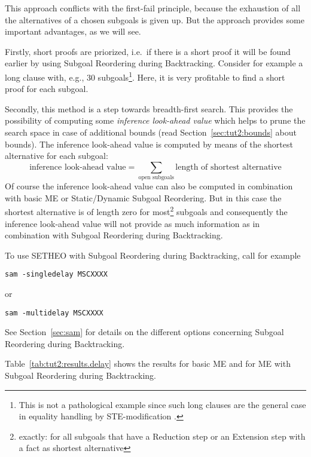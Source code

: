 This approach conflicts with the first-fail principle, because the
exhaustion of all the alternatives of a chosen subgoals is given
up. But the approach provides some important advantages, as we will
see. 

Firstly, short proofs are priorized, i.e.\ if there is a short proof
it will be found earlier by using Subgoal Reordering during
Backtracking. Consider for example a long clause with, e.g., 30
subgoals\footnote{This is not a pathological example since such long
	clauses are the general case in equality handling by
STE-modification \cite{}.}. 
Here, it is very profitable to find a short proof for each subgoal.

Secondly, this method is a step towards breadth-first search. This
provides the possibility of computing some {\em inference look-ahead
value\/} which helps to prune the search space in case of additional
bounds (read Section~\ref{sec:tut2:bounds} about bounds). The
inference look-ahead value is computed by means of the shortest
alternative for each subgoal:
\begin{displaymath}
\mbox{inference look-ahead value} = \sum_{\mbox{open subgoals}} \mbox{length of shortest alternative}
\end{displaymath}
Of course the inference look-ahead value can also be computed in
combination with basic ME or Static/Dynamic Subgoal Reordering. But in
this case the shortest alternative is of length zero for
most\footnote{exactly: for all subgoals that have a Reduction step or
	an Extension step with a fact as shortest alternative} 
subgoals and consequently the inference look-ahead value will not
provide as much information as in combination with Subgoal Reordering
during Backtracking. 

To use SETHEO with Subgoal Reordering during Backtracking, call for
example 
\begin{center}
\begin{verbatim}
sam -singledelay MSCXXXX
\end{verbatim}
\end{center}
or 
\begin{center}
\begin{verbatim}
sam -multidelay MSCXXXX
\end{verbatim}
\end{center}
See Section~\ref{sec:sam} for details on the different options
concerning Subgoal Reordering during Backtracking.

Table~\ref{tab:tut2:results.delay} shows the results for basic
ME and for ME with Subgoal Reordering during Backtracking.

